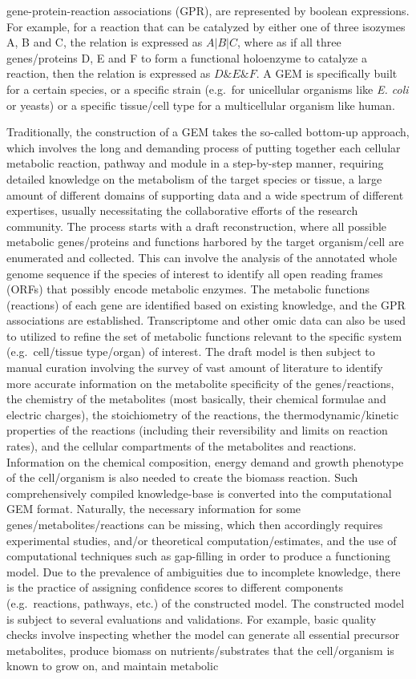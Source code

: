 \documentclass[12pt,twoside,openany,\mydriver]{thesis}  %
\begin{document}
gene-protein-reaction associations (GPR), are represented by boolean expressions. For example, for a reaction that can be catalyzed by either one of three isozymes A, B and C, the relation is expressed as \(A|B|C\), where as if all three genes/proteins D, E and F to form a functional holoenzyme to catalyze a reaction, then the relation is expressed as \(D\&E\&F\). A GEM is specifically built for a certain species, or a specific strain (e.g.~for unicellular organisms like \emph{E. coli} or yeasts) or a specific tissue/cell type for a multicellular organism like human.

Traditionally, the construction of a GEM takes the so-called bottom-up approach, which involves the long and demanding process of putting together each cellular metabolic reaction, pathway and module in a step-by-step manner, requiring detailed knowledge on the metabolism of the target species or tissue, a large amount of different domains of supporting data and a wide spectrum of different expertises, usually necessitating the collaborative efforts of the research community. The process starts with a draft reconstruction, where all possible metabolic genes/proteins and functions harbored by the target organism/cell are enumerated and collected. This can involve the analysis of the annotated whole genome sequence if the species of interest to identify all open reading frames (ORFs) that possibly encode metabolic enzymes. The metabolic functions (reactions) of each gene are identified based on existing knowledge, and the GPR associations are established. Transcriptome and other omic data can also be used to utilized to refine the set of metabolic functions relevant to the specific system (e.g.~cell/tissue type/organ) of interest. The draft model is then subject to manual curation involving the survey of vast amount of literature to identify more accurate information on the metabolite specificity of the genes/reactions, the chemistry of the metabolites (most basically, their chemical formulae and electric charges), the stoichiometry of the reactions, the thermodynamic/kinetic properties of the reactions (including their reversibility and limits on reaction rates), and the cellular compartments of the metabolites and reactions. Information on the chemical composition, energy demand and growth phenotype of the cell/organism is also needed to create the biomass reaction. Such comprehensively compiled knowledge-base is converted into the computational GEM format. Naturally, the necessary information for some genes/metabolites/reactions can be missing, which then accordingly requires experimental studies, and/or theoretical computation/estimates, and the use of computational techniques such as gap-filling in order to produce a functioning model. Due to the prevalence of ambiguities due to incomplete knowledge, there is the practice of assigning confidence scores to different components (e.g.~reactions, pathways, etc.) of the constructed model. The constructed model is subject to several evaluations and validations. For example, basic quality checks involve inspecting whether the model can generate all essential precursor metabolites, produce biomass on nutrients/substrates that the cell/organism is known to grow on, and maintain metabolic 
\end{document}
